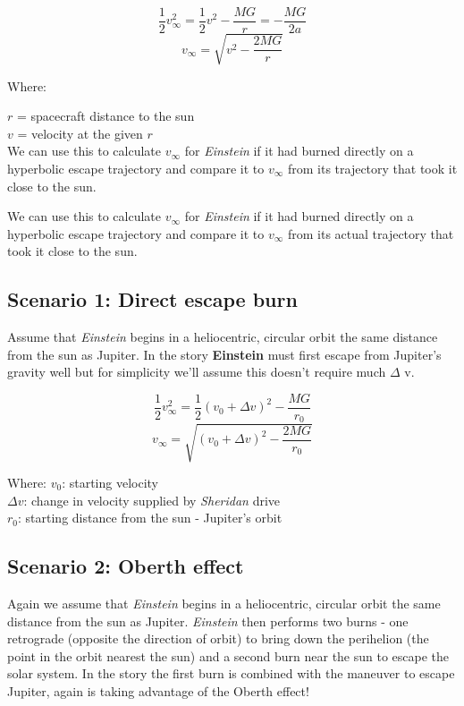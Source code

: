 \documentclass[12pt]{article} %
\begin{document}
$$\frac{1}{2}v_{\infty}^{2} = \frac{1}{2} v^2 - \frac{MG}{r} = -\frac{MG}{2a}$$
$$v_{\infty} = \sqrt{v^2-\frac{2MG}{r}}$$

Where:

$r$ = spacecraft distance to the sun\\
$v$ = velocity at the given $r$\\

We can use this to calculate $v_{\infty}$ for \textit{Einstein} if it had burned directly on a hyperbolic escape trajectory and compare it to $v_{\infty}$ from its trajectory that took it close to the sun.

We can use this to calculate $v_{\infty}$ for \textit{Einstein} if it had burned directly on a hyperbolic escape trajectory and compare it to $v_{\infty}$ from its actual trajectory that took it close to the sun.

\subsection{Scenario 1: Direct escape burn}

Assume that \textit{Einstein} begins in a heliocentric, circular orbit the same distance from the sun as Jupiter. In the story \textbf{Einstein} must first escape from Jupiter's gravity well but for simplicity we'll assume this doesn't require much $\Delta$ v.

$$\frac{1}{2}v_{\infty}^{2} = \frac{1}{2} (v_0 + \Delta v)^2 - \frac{MG}{r_0}$$
$$v_{\infty} = \sqrt{(v_0 + \Delta v)^2-\frac{2MG}{r_0}}$$

Where:
$v_0$: starting velocity\\
$\Delta v$: change in velocity supplied by \textit{Sheridan} drive\\
$r_0$: starting distance from the sun - Jupiter's orbit


\subsection{Scenario 2: Oberth effect}

Again we assume that \textit{Einstein} begins in a heliocentric, circular orbit the same distance from the sun as Jupiter. \textit{Einstein} then performs two burns - one retrograde (opposite the direction of orbit) to bring down the perihelion (the point in the orbit nearest the sun) and a second burn near the sun to escape the solar system. In the story the first burn is combined with the maneuver to escape Jupiter, again is taking advantage of the Oberth effect!
\end{document}
